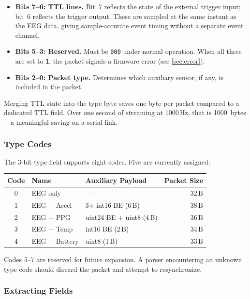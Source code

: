 \documentclass[11pt,a4paper]{article}
\begin{document}
\begin{itemize}
    \item \textbf{Bits 7--6: TTL lines.}  Bit~7 reflects the state of the external trigger input; bit~6 reflects the trigger output.  These are sampled at the same instant as the EEG data, giving sample-accurate event timing without a separate event channel.
    \item \textbf{Bits 5--3: Reserved.}  Must be \texttt{000} under normal operation.  When all three are set to \texttt{1}, the packet signals a firmware error (see \cref{sec:error}).
    \item \textbf{Bits 2--0: Packet type.}  Determines which auxiliary sensor, if any, is included in the packet.
\end{itemize}

Merging TTL state into the type byte saves one byte per packet compared to a dedicated TTL field.  Over one second of streaming at 1000\,Hz, that is 1000~bytes---a meaningful saving on a serial link.

\subsubsection{Type Codes}

The 3-bit type field supports eight codes.  Five are currently assigned:

\medskip
\begin{tabular}{cllr}
\toprule
\textbf{Code} & \textbf{Name} & \textbf{Auxiliary Payload} & \textbf{Packet Size} \\
\midrule
0 & EEG only       & ---                         & 32\,B \\
1 & EEG + Accel    & 3$\times$ int16 BE (6\,B)   & 38\,B \\
2 & EEG + PPG      & uint24 BE + uint8 (4\,B)    & 36\,B \\
3 & EEG + Temp     & int16 BE (2\,B)             & 34\,B \\
4 & EEG + Battery  & uint8 (1\,B)                & 33\,B \\
\bottomrule
\end{tabular}
\medskip

Codes 5--7 are reserved for future expansion.  A parser encountering an unknown type code should discard the packet and attempt to resynchronize.

\subsubsection{Extracting Fields}
\end{document}
